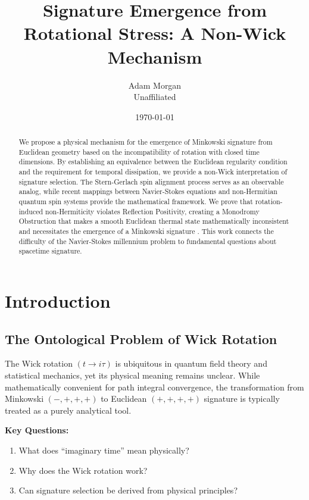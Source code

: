 \documentclass[11pt]{article}
\title{Signature Emergence from Rotational Stress: A Non-Wick Mechanism}
\author{Adam Morgan\\
\small Unaffiliated}
\date{\today}
\begin{document}
\maketitle

\begin{abstract}
We propose a physical mechanism for the emergence of Minkowski signature from Euclidean geometry based on the incompatibility of rotation with closed time dimensions. By establishing an equivalence between the Euclidean regularity condition and the requirement for temporal dissipation, we provide a non-Wick interpretation of signature selection. The Stern-Gerlach\cite{SternGerlach1922} spin alignment process serves as an observable analog, while recent mappings between Navier-Stokes\cite{NavierStokesMillennium} equations and non-Hermitian quantum spin systems provide the mathematical framework.  We prove that rotation-induced non-Hermiticity violates Reflection Positivity\cite{OsterwalderSchrader1973}, creating a Monodromy Obstruction that makes a smooth Euclidean thermal state mathematically inconsistent and necessitates the emergence of a Minkowski signature . This work connects the difficulty of the Navier-Stokes\cite{NavierStokesMillennium} millennium problem to fundamental questions about spacetime signature.
\end{abstract}

\section{Introduction}

\subsection{The Ontological Problem of Wick Rotation}

The Wick rotation $(t \to i\tau)$ is ubiquitous in quantum field theory and statistical mechanics, yet its physical meaning remains unclear. While mathematically convenient for path integral convergence, the transformation from Minkowski $(-,+,+,+)$ to Euclidean $(+,+,+,+)$ signature is typically treated as a purely analytical tool.

\textbf{Key Questions:}
\begin{enumerate}
\item What does ``imaginary time'' mean physically?
\item Why does the Wick rotation work?
\item Can signature selection be derived from physical principles?
\end{enumerate}
\end{document}
